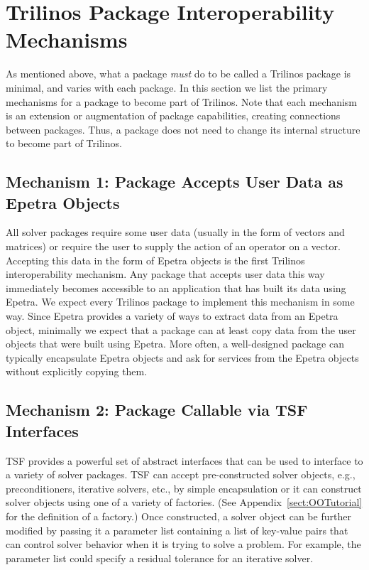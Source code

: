 \documentclass[12pt,relax]{SANDreport}
\begin{document}
\section{Trilinos Package Interoperability Mechanisms}
\label{sect:PackageDefinition}
As mentioned above, what a package {\it must} do to be called a Trilinos
package is minimal, and varies with each package.  In this section we
list the primary mechanisms for a package to become part of Trilinos.
Note that each mechanism is an extension or augmentation of package
capabilities, creating connections between packages.  Thus, a package does 
not need to change its internal structure to become part of Trilinos.

\subsection{Mechanism 1: Package Accepts User Data as Epetra Objects}
All solver packages require some user data (usually in the form of
vectors and matrices) or require the user to supply the action of an
operator on a vector.  Accepting this data in the form of Epetra
objects is the first Trilinos interoperability mechanism.  Any package
that accepts user data this way immediately becomes accessible to an
application that has built its data using Epetra.  We expect every
Trilinos package to implement this mechanism in some way.  Since
Epetra provides a variety of ways to extract data from an Epetra
object, minimally we expect that a package can at least copy data from
the user objects that were built using Epetra.  More often, a well-designed
package can typically encapsulate Epetra objects and ask for services from
the Epetra objects without explicitly copying them.

\subsection{Mechanism 2: Package Callable via TSF Interfaces}
TSF provides a powerful set of abstract interfaces that can be used to
interface to a variety of solver packages.  TSF can accept
pre-constructed solver objects, e.g., preconditioners, iterative
solvers, etc., by simple encapsulation or it can
construct solver objects using one of a variety of factories.  (See
Appendix~\ref{sect:OOTutorial} for the definition of a factory.)  Once
constructed, a solver object can be further modified by passing it a
parameter list containing a list of key-value pairs that can control
solver behavior when it is trying to solve a problem.  For example,
the parameter list could specify a residual tolerance for an iterative solver.
\end{document}
